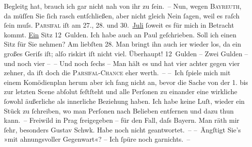 \begin{ledgroupsized}[t]{13cm}
               Begleitg hat, brauch ich gar nicht nah von ihr zu ſein. –\pend
           \pstart
           Nun, wegen \textsc{Bayreuth}, da müſſen Sie ſich rasch {\pb}entſchließen,
               aber nicht gleich Nein ſagen, weil es raſch ſein muſs. \textsc{Parsifal} iſt am 27., 28. und 30. \uline{Juli}{ }ſoweit es für mich in Betracht kommt. \uline{Ein}{ }Sitz 12 Gulden. Ich habe auch an Paul
               geſchrieben. Soll ich ei{\pb}nen Sitz für Sie nehmen?
               Am liebſten 28. Man bringt ihn auch i{\geminationm}er
               wieder los, da ein großes Geriſs iſt; alſo riskirt iſt nicht viel. Überhaupt!
               12 Gulden – Zwei Gulden – und noch vier – – Und noch ſechs – Man {\pb}hält es und hat vier achter gegen vier zehner, da
               iſt doch die \textsc{Parsifal-Chance} eher werth. –\pend
           \pstart
           – Ich ſpiele mich mit einem Komödienplan herum {\dotsfour} aber ich fang nicht an,
               bevor die Sache von der 1. bis zur letzten Scene abſolut feſtſteht und alle {\pb}Perſonen zu einander eine wirkliche ſowohl
               äußerliche als innerliche Beziehung haben. Ich habe keine Luſt, wieder ein Stück zu
               ſchreiben, wo man Perſonen nach Belieben entfernen und dazu thun kann. – Freiwild in Prag
                  frei{\pb}gegeben – für den Fall, daſs Bayern. Man räth mir ſehr, besonders Gustav Schwk. Habe noch nicht geantwortet. –\pend
           \pstart
           – Ängſtigt Sie’s »mit ahnungsvoller
                  Gegenwart«? – Ich ſpüre noch garnichts. –\pend

\end{ledgroupsized}

